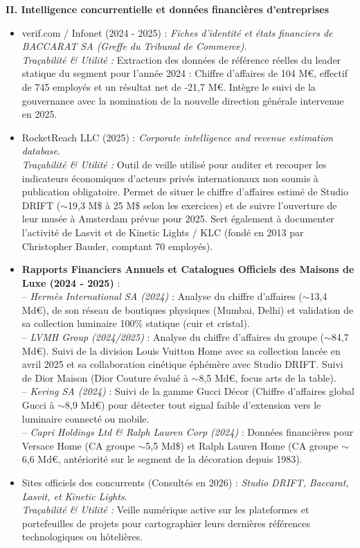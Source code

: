 \documentclass[11pt,a4paper]{article}
\begin{document}
\vspace{0.8em}
\textbf{II. Intelligence concurrentielle et données financières d'entreprises}
\begin{itemize}
  \item verif.com / Infonet (2024 - 2025) : \textit{Fiches d'identité et états financiers de BACCARAT SA (Greffe du Tribunal de Commerce)}. \\
  \textit{Traçabilité \& Utilité :} Extraction des données de référence réelles du leader statique du segment pour l'année 2024 : Chiffre d'affaires de 104 M€, effectif de 745 employés et un résultat net de -21,7 M€. Intègre le suivi de la gouvernance avec la nomination de la nouvelle direction générale intervenue en 2025.
  
  \item RocketReach LLC (2025) : \textit{Corporate intelligence and revenue estimation database}. \\
  \textit{Traçabilité \& Utilité :} Outil de veille utilisé pour auditer et recouper les indicateurs économiques d'acteurs privés internationaux non soumis à publication obligatoire. Permet de situer le chiffre d'affaires estimé de Studio DRIFT ($\sim$19,3 M\$ à 25 M\$ selon les exercices) et de suivre l'ouverture de leur musée à Amsterdam prévue pour 2025. Sert également à documenter l'activité de Lasvit et de Kinetic Lights / KLC (fondé en 2013 par Christopher Bauder, comptant 70 employés).
  
  \item \textbf{Rapports Financiers Annuels et Catalogues Officiels des Maisons de Luxe (2024 - 2025)} :
  \\ -- \textit{Hermès International SA (2024)} : Analyse du chiffre d'affaires ($\sim$13,4 Md€), de son réseau de boutiques physiques (Mumbai, Delhi) et validation de sa collection luminaire 100\% statique (cuir et cristal).
  \\ -- \textit{LVMH Group (2024/2025)} : Analyse du chiffre d'affaires du groupe ($\sim$84,7 Md€). Suivi de la division Louis Vuitton Home avec sa collection lancée en avril 2025 et sa collaboration cinétique éphémère avec Studio DRIFT. Suivi de Dior Maison (Dior Couture évalué à $\sim$8,5 Md€, focus arts de la table).
  \\ -- \textit{Kering SA (2024)} : Suivi de la gamme Gucci Décor (Chiffre d'affaires global Gucci à $\sim$8,9 Md€) pour détecter tout signal faible d'extension vers le luminaire connecté ou mobile.
  \\ -- \textit{Capri Holdings Ltd \& Ralph Lauren Corp (2024)} : Données financières pour Versace Home (CA groupe $\sim$5,5 Md\$) et Ralph Lauren Home (CA groupe $\sim$6,6 Md\textsf{€}, antériorité sur le segment de la décoration depuis 1983).
  
  \item Sites officiels des concurrents (Consultés en 2026) : \textit{Studio DRIFT, Baccarat, Lasvit, et Kinetic Lights}. \\
  \textit{Traçabilité \& Utilité :} Veille numérique active sur les plateformes et portefeuilles de projets pour cartographier leurs dernières références technologiques ou hôtelières.
\end{itemize}
\end{document}
